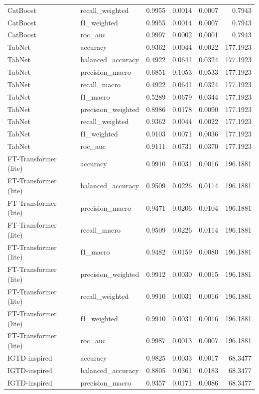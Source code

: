 \begin{tabular}{llrrrr}
CatBoost & recall_weighted & 0.9955 & 0.0014 & 0.0007 & 0.7943 \\
CatBoost & f1_weighted & 0.9955 & 0.0014 & 0.0007 & 0.7943 \\
CatBoost & roc_auc & 0.9997 & 0.0002 & 0.0001 & 0.7943 \\
TabNet & accuracy & 0.9362 & 0.0044 & 0.0022 & 177.1923 \\
TabNet & balanced_accuracy & 0.4922 & 0.0641 & 0.0324 & 177.1923 \\
TabNet & precision_macro & 0.6851 & 0.1053 & 0.0533 & 177.1923 \\
TabNet & recall_macro & 0.4922 & 0.0641 & 0.0324 & 177.1923 \\
TabNet & f1_macro & 0.5289 & 0.0679 & 0.0344 & 177.1923 \\
TabNet & precision_weighted & 0.8986 & 0.0178 & 0.0090 & 177.1923 \\
TabNet & recall_weighted & 0.9362 & 0.0044 & 0.0022 & 177.1923 \\
TabNet & f1_weighted & 0.9103 & 0.0071 & 0.0036 & 177.1923 \\
TabNet & roc_auc & 0.9111 & 0.0731 & 0.0370 & 177.1923 \\
FT-Transformer (lite) & accuracy & 0.9910 & 0.0031 & 0.0016 & 196.1881 \\
FT-Transformer (lite) & balanced_accuracy & 0.9509 & 0.0226 & 0.0114 & 196.1881 \\
FT-Transformer (lite) & precision_macro & 0.9471 & 0.0206 & 0.0104 & 196.1881 \\
FT-Transformer (lite) & recall_macro & 0.9509 & 0.0226 & 0.0114 & 196.1881 \\
FT-Transformer (lite) & f1_macro & 0.9482 & 0.0159 & 0.0080 & 196.1881 \\
FT-Transformer (lite) & precision_weighted & 0.9912 & 0.0030 & 0.0015 & 196.1881 \\
FT-Transformer (lite) & recall_weighted & 0.9910 & 0.0031 & 0.0016 & 196.1881 \\
FT-Transformer (lite) & f1_weighted & 0.9910 & 0.0031 & 0.0016 & 196.1881 \\
FT-Transformer (lite) & roc_auc & 0.9987 & 0.0013 & 0.0007 & 196.1881 \\
IGTD-inspired & accuracy & 0.9825 & 0.0033 & 0.0017 & 68.3477 \\
IGTD-inspired & balanced_accuracy & 0.8805 & 0.0361 & 0.0183 & 68.3477 \\
IGTD-inspired & precision_macro & 0.9357 & 0.0171 & 0.0086 & 68.3477 \\

\end{tabular}
